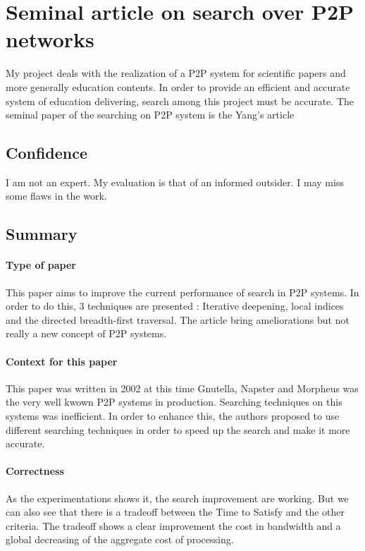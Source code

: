 
\section{Seminal article on search over P2P networks}

My project deals with the realization of a P2P system for
scientific papers and more generally education contents.
In order to provide an efficient and accurate system of
education delivering, search among this project must be
accurate.
The seminal paper of the searching on P2P system is
the Yang's article \cite{Yang02improvingsearch}

\subsection{Confidence}

I am not an expert. My evaluation is that of an informed
outsider. I may miss some flaws in the work.

\subsection{Summary}

\paragraph{Type of paper}

This paper aims to improve the current performance of search in P2P systems.
In order to do this, 3 techniques are presented : Iterative deepening, local
indices and the directed breadth-first traversal. The article bring ameliorations
but not really a new concept of P2P systems.

\paragraph{Context for this paper}

This paper was written in 2002 at this time Gnutella, Napster and Morpheus was the
very well kwown P2P systems in production. Searching techniques on this systems
was inefficient. In order to enhance this, the authors proposed to use different
searching techniques in order to speed up the search and make it more accurate.

\paragraph{Correctness}

As the experimentations shows it, the search improvement are working.
But we can also see that there is a tradeoff between the Time to Satisfy
and the other criteria. The tradeoff shows a clear improvement the cost
in bandwidth and a global decreasing of the aggregate cost of processing.


